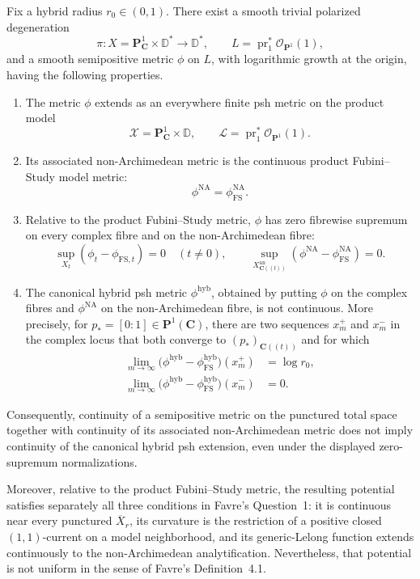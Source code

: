 \begin{theorem}
Fix a hybrid radius \(r_0\in(0,1)\).  There exist a smooth trivial
polarized degeneration
\[
 \pi\colon X=\mathbf P^1_{\mathbf C}\times\mathbb D^*
       \longrightarrow\mathbb D^*,
 \qquad
 L=\operatorname{pr}_1^*\mathcal O_{\mathbf P^1}(1),
\]
and a smooth semipositive metric \(\phi\) on \(L\), with logarithmic
growth at the origin, having the following properties.
\begin{enumerate}
\item The metric \(\phi\) extends as an everywhere finite psh metric on
the product model
\[
 \mathcal X=\mathbf P^1_{\mathbf C}\times\mathbb D,
 \qquad
 \mathcal L=\operatorname{pr}_1^*\mathcal O_{\mathbf P^1}(1).
\]
\item Its associated non-Archimedean metric is the continuous product
Fubini--Study model metric:
\[
                   \phi^{\mathrm{NA}}
                   =\phi_{\mathrm{FS}}^{\mathrm{NA}}.
\]
\item Relative to the product Fubini--Study metric, \(\phi\) has zero
fibrewise supremum on every complex fibre and on the non-Archimedean
fibre:
\[
 \sup_{X_t}(\phi_t-\phi_{\mathrm{FS},t})=0
 \quad(t\ne0),
 \qquad
 \sup_{X_{\mathbf C((t))}^{\mathrm{an}}}
 (\phi^{\mathrm{NA}}-\phi_{\mathrm{FS}}^{\mathrm{NA}})=0.
\]
\item The canonical hybrid psh metric \(\phi^{\mathrm{hyb}}\), obtained
by putting \(\phi\) on the complex fibres and
\(\phi^{\mathrm{NA}}\) on the non-Archimedean fibre, is not continuous.
More precisely, for \(p_*=[0:1]\in\mathbf P^1(\mathbf C)\), there are
two sequences \(x_m^+\) and \(x_m^-\) in the complex locus that both
converge to \((p_*)_{\mathbf C((t))}\) and for which
\[
\begin{aligned}
 \lim_{m\to\infty}
 \bigl(\phi^{\mathrm{hyb}}
       -\phi_{\mathrm{FS}}^{\mathrm{hyb}}\bigr)(x_m^+)
   &=\log r_0,\\
 \lim_{m\to\infty}
 \bigl(\phi^{\mathrm{hyb}}
       -\phi_{\mathrm{FS}}^{\mathrm{hyb}}\bigr)(x_m^-)
   &=0.
\end{aligned}
\]
\end{enumerate}
Consequently, continuity of a semipositive metric on the punctured total
space together with continuity of its associated non-Archimedean metric
does not imply continuity of the canonical hybrid psh extension, even
under the displayed zero-supremum normalizations.

Moreover, relative to the product Fubini--Study metric, the resulting
potential satisfies separately all three conditions in Favre's
Question~1: it is continuous near every punctured
\(\overline X_r\), its curvature is the restriction of a positive
closed \((1,1)\)-current on a model neighborhood, and its
generic-Lelong function extends continuously to the non-Archimedean
analytification.  Nevertheless, that potential is not uniform in the
sense of Favre's Definition~4.1.
\end{theorem}

